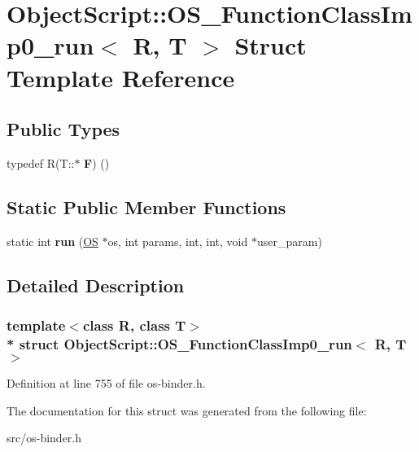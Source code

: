 \hypertarget{struct_object_script_1_1_o_s___function_class_imp0__run}{}\section{Object\+Script\+:\+:O\+S\+\_\+\+Function\+Class\+Imp0\+\_\+run$<$ R, T $>$ Struct Template Reference}
\label{struct_object_script_1_1_o_s___function_class_imp0__run}
\subsection*{Public Types}
\begin{DoxyCompactItemize}
\item 
typedef R(T\+::$\ast$ {\bfseries F}) ()\hypertarget{struct_object_script_1_1_o_s___function_class_imp0__run_a4d064b3ca4b4a86a7a045742f7aad38d}{}\label{struct_object_script_1_1_o_s___function_class_imp0__run_a4d064b3ca4b4a86a7a045742f7aad38d}

\end{DoxyCompactItemize}
\subsection*{Static Public Member Functions}
\begin{DoxyCompactItemize}
\item 
static int {\bfseries run} (\hyperlink{class_object_script_1_1_o_s}{OS} $\ast$os, int params, int, int, void $\ast$user\+\_\+param)\hypertarget{struct_object_script_1_1_o_s___function_class_imp0__run_ad76f49e8ad0f073d8951dce53974ef01}{}\label{struct_object_script_1_1_o_s___function_class_imp0__run_ad76f49e8ad0f073d8951dce53974ef01}

\end{DoxyCompactItemize}


\subsection{Detailed Description}
\subsubsection*{template$<$class R, class T$>$\\*
struct Object\+Script\+::\+O\+S\+\_\+\+Function\+Class\+Imp0\+\_\+run$<$ R, T $>$}



Definition at line 755 of file os-\/binder.\+h.



The documentation for this struct was generated from the following file\+:\begin{DoxyCompactItemize}
\item 
src/os-\/binder.\+h\end{DoxyCompactItemize}
